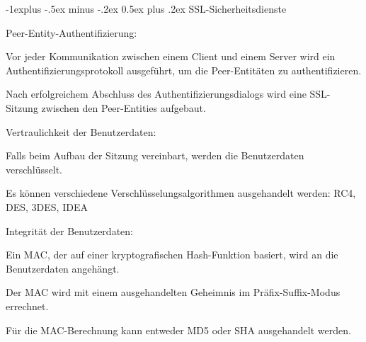 \documentclass[a4paper]{article}
\makeatletter
\renewcommand{\subsection}{\@startsection{subsection}{2}{0mm}%
 {-1explus -.5ex minus -.2ex}%
 {0.5ex plus .2ex}%
 {\normalfont\normalsize\bfseries}}
\makeatother
\begin{document}
\begin{multicols}{3}
\begin{itemize*}
            \subsection{SSL-Sicherheitsdienste}
            \begin{itemize*}
                  \item Peer-Entity-Authentifizierung:
                  \begin{itemize*}
                        \item Vor jeder Kommunikation zwischen einem Client und einem Server wird ein Authentifizierungsprotokoll ausgeführt, um die Peer-Entitäten zu authentifizieren.
                        \item Nach erfolgreichem Abschluss des Authentifizierungsdialogs wird eine SSL-Sitzung zwischen den Peer-Entities aufgebaut.
                  \end{itemize*}
                  \item Vertraulichkeit der Benutzerdaten:
                  \begin{itemize*}
                        \item Falls beim Aufbau der Sitzung vereinbart, werden die Benutzerdaten verschlüsselt.
                        \item Es können verschiedene Verschlüsselungsalgorithmen ausgehandelt werden: RC4, DES, 3DES, IDEA
                  \end{itemize*}
                  \item Integrität der Benutzerdaten:
                  \begin{itemize*}
                        \item Ein MAC, der auf einer kryptografischen Hash-Funktion basiert, wird an die Benutzerdaten angehängt.
                        \item Der MAC wird mit einem ausgehandelten Geheimnis im Präfix-Suffix-Modus errechnet.
                        \item Für die MAC-Berechnung kann entweder MD5 oder SHA ausgehandelt werden.
                  \end{itemize*}
            \end{itemize*}


\end{itemize*}
\end{multicols}
\end{document}
